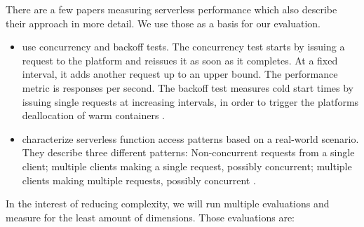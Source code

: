 


There are a few papers measuring serverless performance which also describe their approach in more detail. We use those as a basis for our evaluation.

\begin{itemize}
    \item \citeauthor{McGrath2017} use concurrency and backoff tests. The concurrency test starts by issuing a request to the platform and reissues it as soon as it completes. At a fixed interval, it adds another request up to an upper bound. The performance metric is responses per second. The backoff test measures cold start times by issuing single requests at increasing intervals, in order to trigger the platforms deallocation of warm containers \cite{McGrath2017}.
    \item \citeauthor{Hall2019} characterize serverless function access patterns based on a real-world scenario. They describe three different patterns: Non-concurrent requests from a single client; multiple clients making a single request, possibly concurrent; multiple clients making multiple requests, possibly concurrent \cite{Hall2019}.
\end{itemize}

In the interest of reducing complexity, we will run multiple evaluations and measure for the least amount of dimensions. Those evaluations are:

